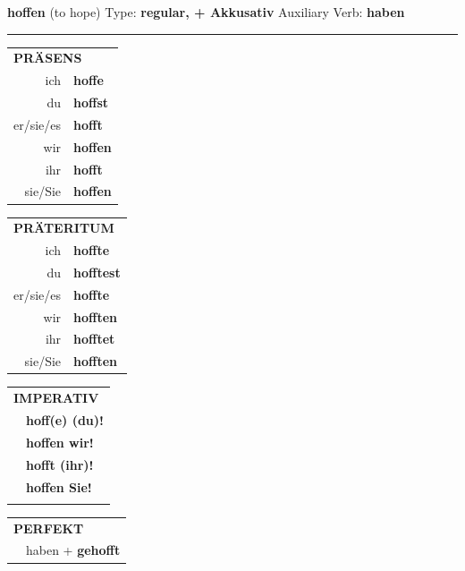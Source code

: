\documentclass[10pt,a4paper]{revtex4-2}
\begin{document}
\begin{verbbox-acc}
    {\Large \bf hoffen} (to hope) \hfill Type: \textbf{regular, + Akkusativ} \hfill Auxiliary Verb: \textbf{haben} 
    
     \vspace{5pt}

    \hrule
    
    \vspace{5pt}

  \begin{tabular}{rl}
     \multicolumn{2}{l}{\textbf{PRÄSENS} }\\
    ich & \textbf{hoffe}\\
    du & \textbf{hoffst}\\
    er/sie/es & \textbf{hofft}\\
    wir & \textbf{hoffen}\\
    ihr & \textbf{hofft}\\
    sie/Sie & \textbf{hoffen}\\
  \end{tabular}
  \hfill
     \begin{tabular}{rl}
    \multicolumn{2}{l}{\textbf{PRÄTERITUM} }\\
    ich & \textbf{hoffte}\\
    du & \textbf{hofftest}\\
    er/sie/es & \textbf{hoffte}\\
    wir & \textbf{hofften}\\
    ihr & \textbf{hofftet}\\
    sie/Sie & \textbf{hofften}\\
  \end{tabular}
  \hfill
  \begin{tabular}{rl}
     \multicolumn{2}{l}{\textbf{IMPERATIV} }\\
   & \textbf{hoff(e) (du)!}\\
   & \textbf{hoffen wir!}\\
   & \textbf{hofft (ihr)!}\\
   & \textbf{hoffen Sie!}\\
   & \vspace{10pt}
  \end{tabular}

    \vspace{10pt}

 \begin{tabular}{rl}
     \multicolumn{2}{l}{\textbf{PERFEKT}}\\
   & haben + \textbf{gehofft}\\
  \end{tabular}
\hfill
   \begin{tabular}{rl}
   

\end{tabular}
\end{verbbox-acc}
\end{document}
